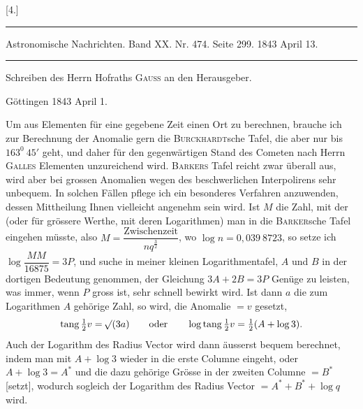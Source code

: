 \clearpage
\hypertarget{native-377-letter4}{}\label{native-377-letter4}
\begin{center}
[4.]\par\medskip
\rule{\linewidth}{.4pt}\par
{\small Astronomische Nachrichten. Band XX. Nr. 474. Seite 299. 1843 April 13.}\par
\rule{\linewidth}{.4pt}\par\medskip
Schreiben des Herrn Hofraths \textsc{Gauss} an den Herausgeber.\par
Göttingen 1843 April 1.
\end{center}
\noindent\hspace*{\parindent}Um aus Elementen für eine gegebene Zeit einen Ort zu berechnen, brauche ich zur Berechnung der Anomalie gern die \textsc{Burckhardt}sche Tafel, die aber nur bis \(163^0\ 45'\) geht, und daher für den gegenwärtigen Stand des Cometen nach Herrn \textsc{Galles} Elementen unzureichend wird. \textsc{Barkers} Tafel reicht zwar überall aus, wird aber bei grossen Anomalien wegen des beschwerlichen Interpolirens sehr unbequem. In solchen Fällen pflege ich ein besonderes Verfahren anzuwenden, dessen Mittheilung Ihnen vielleicht angenehm sein wird. Ist \(M\) die Zahl, mit der (oder für grössere Werthe, mit deren Logarithmen) man in die \textsc{Barker}sche Tafel eingehen müsste, also \(M=\dfrac{\text{Zwischenzeit}}{nq^{\frac32}}\), wo \(\log n=0{,}039\ 8723\), so setze ich \(\log\dfrac{MM}{16875}=3P\), und suche in meiner kleinen Logarithmentafel, \(A\) und \(B\) in der dortigen Bedeutung genommen, der Gleichung \(3A+2B=3P\) Genüge zu leisten, was immer, wenn \(P\) gross ist, sehr schnell bewirkt wird. Ist dann \(a\) die zum Logarithmen \(A\) gehörige Zahl, so wird, die Anomalie \(=v\) gesetzt,
\[
\mathrm{tang}\,\tfrac12v=\mathord{{}^{}\!\surd}(3a)\qquad\text{oder}\qquad\log\mathrm{tang}\,\tfrac12v=\tfrac12(A+\log3).
\]
Auch der Logarithm des Radius Vector wird dann äusserst bequem berechnet, indem man mit \(A+\log3\) wieder in die erste Columne eingeht, oder \(A+\log3=A^*\) und die dazu gehörige Grösse in der zweiten Columne \(=B^*\) [setzt], wodurch sogleich der Logarithm des Radius Vector \(=A^*+B^*+\log q\) wird.
\par
